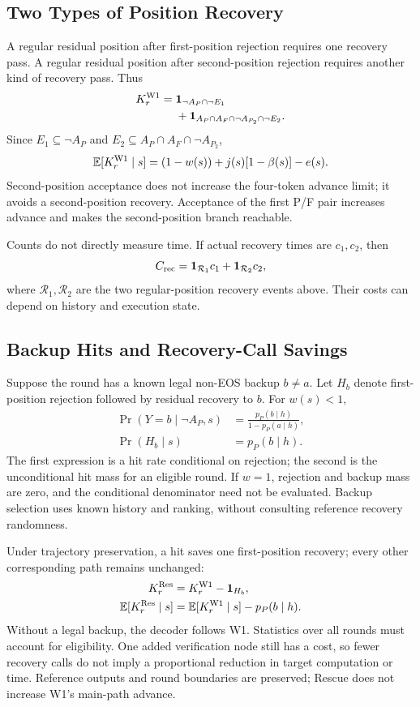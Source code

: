 \subsection{Two Types of Position Recovery}
\label{app:recovery}
A regular residual position after first-position rejection requires one recovery pass. A regular residual position after second-position rejection requires another kind of recovery pass. Thus
\begin{align}
K_r^{\mathrm{W1}}
={}&\mathbf{1}_{\neg A_P\cap\neg E_1}\nonumber\\
&+\mathbf{1}_{A_P\cap A_F\cap\neg A_{P_2}\cap\neg E_2}.
\end{align}
Since $E_1\subseteq\neg A_P$ and $E_2\subseteq A_P\cap A_F\cap\neg A_{P_2}$,
\begin{equation}
\mathbb{E}[K_r^{\mathrm{W1}}\mid s]=(1-w(s))+j(s)[1-\beta(s)]-e(s).
\end{equation}
Second-position acceptance does not increase the four-token advance limit; it avoids a second-position recovery. Acceptance of the first P/F pair increases advance and makes the second-position branch reachable.

Counts do not directly measure time. If actual recovery times are $c_1,c_2$, then
\begin{equation}
C_{\rm rec}=\mathbf{1}_{\mathcal R_1}c_1+\mathbf{1}_{\mathcal R_2}c_2,
\end{equation}
where $\mathcal R_1,\mathcal R_2$ are the two regular-position recovery events above. Their costs can depend on history and execution state.

\subsection{Backup Hits and Recovery-Call Savings}
\label{app:hits}
Suppose the round has a known legal non-EOS backup $b\ne a$. Let $H_b$ denote first-position rejection followed by residual recovery to $b$. For $w(s)<1$,
\begin{align}
\Pr(Y=b\mid\neg A_P,s)&=\frac{p_P(b\mid h)}{1-p_P(a\mid h)},\\
\Pr(H_b\mid s)&=p_P(b\mid h).
\end{align}
The first expression is a hit rate conditional on rejection; the second is the unconditional hit mass for an eligible round. If $w=1$, rejection and backup mass are zero, and the conditional denominator need not be evaluated. Backup selection uses known history and ranking, without consulting reference recovery randomness.

Under trajectory preservation, a hit saves one first-position recovery; every other corresponding path remains unchanged:
\begin{align}
K_r^{\mathrm{Res}}&=K_r^{\mathrm{W1}}-\mathbf{1}_{H_b},\\
\mathbb{E}[K_r^{\mathrm{Res}}\mid s]&=\mathbb{E}[K_r^{\mathrm{W1}}\mid s]-p_P(b\mid h).
\end{align}
Without a legal backup, the decoder follows W1. Statistics over all rounds must account for eligibility. One added verification node still has a cost, so fewer recovery calls do not imply a proportional reduction in target computation or time. Reference outputs and round boundaries are preserved; Rescue does not increase W1's main-path advance.

